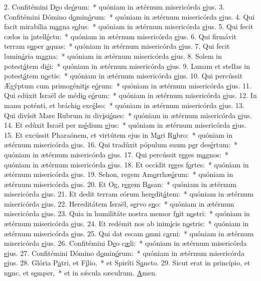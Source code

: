2. Confitémini D\uline{e}o de\uline{ó}rum:~* quóniam in ætérnum misericórda \uline{e}jus.
3. Confitémini Dómino d\uline{o}min\uline{ó}rum:~* quóniam in ætérnum misericórda \uline{e}jus.
4. Qui facit mirabília m\uline{a}gna s\uline{o}lus:~* quóniam in ætérnum misericórda \uline{e}jus.
5. Qui fecit cælos in \uline{i}ntell\uline{é}ctu:~* quóniam in ætérnum misericórda \uline{e}jus.
6. Qui firmávit terram s\uline{u}per \uline{a}quas:~* quóniam in ætérnum misericórda \uline{e}jus.
7. Qui fecit lumin\uline{á}ria m\uline{a}gna:~* quóniam in ætérnum misericórda \uline{e}jus.
8. Solem in potest\uline{á}tem di\uline{é}i:~* quóniam in ætérnum misericórda \uline{e}jus.
9. Lunam et stellas in potest\uline{á}tem n\uline{o}ctis:~* quóniam in ætérnum misericórda \uline{e}jus.
10. Qui percússit Ægýptum cum primogénit\uline{i}s e\uline{ó}rum:~* quóniam in ætérnum misericórda \uline{e}jus.
11. Qui edúxit Israël de médi\uline{o} e\uline{ó}rum:~* quóniam in ætérnum misericórda \uline{e}jus.
12. In manu poténti, et bráchi\uline{o} exc\uline{é}lso:~* quóniam in ætérnum misericórda \uline{e}jus.
13. Qui divísit Mare Rubrum in div\uline{i}si\uline{ó}nes:~* quóniam in ætérnum misericórda \uline{e}jus.
14. Et edúxit Israël per m\uline{é}dium \uline{e}jus:~* quóniam in ætérnum misericórda \uline{e}jus.
15. Et excússit Pharaónem, et virtútem ejus in M\uline{a}ri R\uline{u}bro:~* quóniam in ætérnum misericórda \uline{e}jus.
16. Qui tradúxit pópulum suum p\uline{e}r des\uline{é}rtum:~* quóniam in ætérnum misericórda \uline{e}jus.
17. Qui percússit r\uline{e}ges m\uline{a}gnos:~* quóniam in ætérnum misericórda \uline{e}jus.
18. Et occídit r\uline{e}ges f\uline{o}rtes:~* quóniam in ætérnum misericórda \uline{e}jus.
19. Sehon, regem Am\uline{o}rrhæ\uline{ó}rum:~* quóniam in ætérnum misericórda \uline{e}jus.
20. Et Og, r\uline{e}gem B\uline{a}san:~* quóniam in ætérnum misericórda \uline{e}jus.
21. Et dedit terram eórum her\uline{e}dit\uline{á}tem:~* quóniam in ætérnum misericórda \uline{e}jus.
22. Hereditátem Israël, s\uline{e}rvo s\uline{u}o:~* quóniam in ætérnum misericórda \uline{e}jus.
23. Quia in humilitáte nostra memor f\uline{u}it n\uline{o}stri:~* quóniam in ætérnum misericórda \uline{e}jus.
24. Et redémit nos ab inim\uline{í}cis n\uline{o}stris:~* quóniam in ætérnum misericórda \uline{e}jus.
25. Qui dat escam \uline{o}mni c\uline{a}rni:~* quóniam in ætérnum misericórda \uline{e}jus.
26. Confitémini D\uline{e}o c\uline{æ}li:~* quóniam in ætérnum misericórda \uline{e}jus.
27. Confitémini Dómino d\uline{o}min\uline{ó}rum:~* quóniam in ætérnum misericórda \uline{e}jus.
28. Glória P\uline{a}tri, et F\uline{í}lio,~* et Spiríti S\uline{a}ncto.
29. Sicut erat in princípio, et n\uline{u}nc, et s\uline{e}mper,~* et in sǽcula sæculrum. \uline{A}men.
